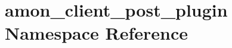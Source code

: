 \hypertarget{namespaceamon__client__post__plugin}{\section{amon\-\_\-client\-\_\-post\-\_\-plugin Namespace Reference}
\label{namespaceamon__client__post__plugin}
}
